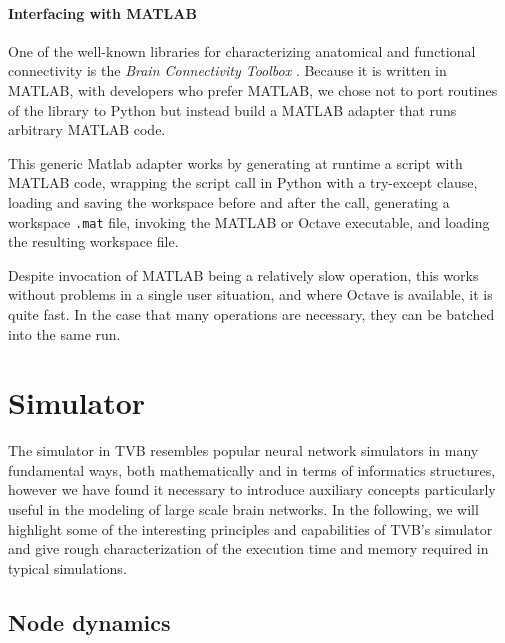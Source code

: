 \documentclass{bioinfo}
\begin{document}
\paragraph{Interfacing with MATLAB}

One of the well-known libraries for characterizing anatomical 
and functional connectivity is the \emph{Brain Connectivity Toolbox} 
\citep{Rubinov_2010}. 
Because it is written in MATLAB, with developers who prefer MATLAB, we 
chose not to port routines of the library to Python but instead build
a MATLAB adapter that runs arbitrary MATLAB code. 

This generic Matlab adapter works by generating at runtime a script with MATLAB code, 
wrapping the script call in Python with a try-except clause,  
loading and saving the workspace before and after the call,
generating a workspace \texttt{.mat} file, invoking the MATLAB or Octave
executable, and loading the resulting workspace file. 

Despite invocation of MATLAB being a relatively slow operation, this works
without problems in a single user situation, and where Octave is available, it
is quite fast. In the case that many operations are necessary, they can be
batched into the same run.

\section{Simulator}

The simulator in TVB resembles popular neural network simulators in 
many fundamental ways, both mathematically and in terms of informatics 
structures, however we have found it necessary to introduce auxiliary
concepts particularly useful in the modeling of large scale brain 
networks. In the following, we will highlight some of the interesting
principles and capabilities of TVB's simulator and give rough characterization
of the execution time and memory required in typical simulations.

\subsection{Node dynamics}
\end{document}
